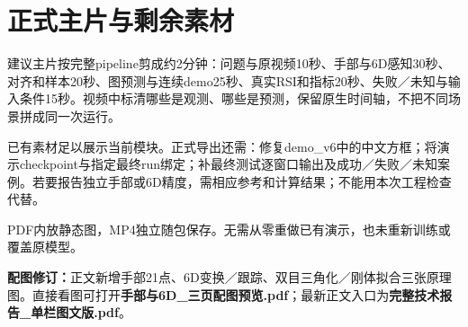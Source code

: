 \documentclass[10pt,a4paper]{ctexart}
\begin{document}
\section{正式主片与剩余素材}
建议主片按完整pipeline剪成约2分钟：问题与原视频10秒、手部与6D感知30秒、对齐和样本20秒、图预测与连续demo25秒、真实RSI和指标20秒、失败／未知与输入条件15秒。视频中标清哪些是观测、哪些是预测，保留原生时间轴，不把不同场景拼成同一次运行。

已有素材足以展示当前模块。正式导出还需：修复demo\_v6中的中文方框；将演示checkpoint与指定最终run绑定；补最终测试逐窗口输出及成功／失败／未知案例。若要报告独立手部或6D精度，需相应参考和计算结果；不能用本次工程检查代替。

PDF内放静态图，MP4独立随包保存。无需从零重做已有演示，也未重新训练或覆盖原模型。

\textbf{配图修订：}正文新增手部21点、6D变换／跟踪、双目三角化／刚体拟合三张原理图。直接看图可打开\textbf{手部与6D\_三页配图预览.pdf}；最新正文入口为\textbf{完整技术报告\_单栏图文版.pdf}。
\end{document}
